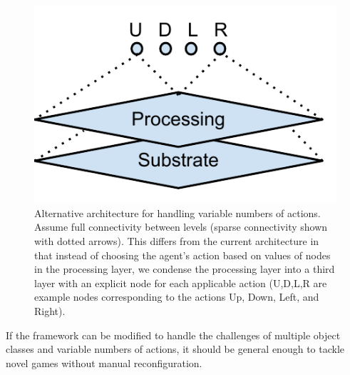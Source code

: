 \documentclass{acm_proc_article-sp}
\begin{document}
\begin{figure}[htp]
\begin{center}
\includegraphics[width=\columnwidth]{figures/possiblearch}
\end{center}
\caption{Alternative architecture for handling variable numbers of actions. Assume full connectivity between levels (sparse connectivity shown with dotted arrows). This differs from the current architecture in that instead of choosing the agent's action based on values of nodes in the processing layer, we condense the processing layer into a third layer with an explicit node for each applicable action (U,D,L,R are example nodes corresponding to the actions Up, Down, Left, and Right).}
\label{fig:possiblearch}
\end{figure}

If the framework can be modified to handle the challenges of multiple object classes and variable numbers of actions, it should be general enough to tackle novel games without manual reconfiguration.
\end{document}
